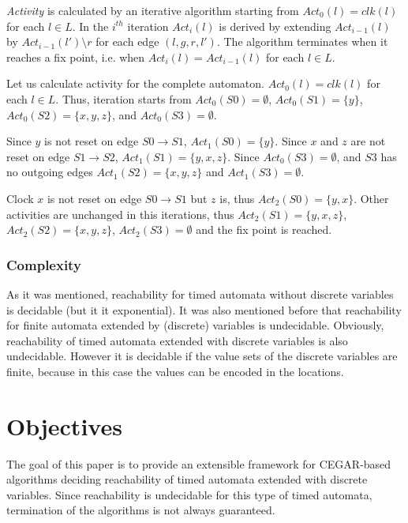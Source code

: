 \emph{Activity} is calculated by an iterative algorithm starting from $Act_0(l)=clk(l)$ for each $l \in L$. In the $i^{th}$ iteration $Act_{i}(l)$ is derived by extending $Act_{i-1}(l)$ by $Act_{i-1}(l')\setminus r$ for each edge $(l,g,r,l')$. The algorithm terminates when it reaches a fix point, i.e. when $Act_{i}(l)=Act_{i-1}(l)$ for each $l\in L$.

\begin{example}
	Let us calculate activity for the complete automaton. $Act_0(l)=clk(l)$ for each $l \in L$. Thus, iteration starts from $Act_0(S0)=\emptyset$, $Act_0(S1)=\{y\}$, $Act_0(S2)=\{x,y,z\}$, and $Act_0(S3)=\emptyset$. 
	
	Since $y$ is not reset on edge $S0 \to S1$, $Act_1(S0)=\{y\}$. Since $x$ and $z$ are not reset on edge $S1 \to S2$, $Act_1(S1)=\{y,x,z\}$. Since $Act_0(S3)=\emptyset$, and $S3$ has no outgoing edges $Act_1(S2)=\{x,y,z\}$ and $Act_1(S3)=\emptyset$.
	
	Clock $x$ is not reset on edge  $S0 \to S1$ but $z$ is, thus $Act_2(S0)=\{y,x\}$. Other activities are unchanged in this iterations, thus $Act_2(S1)=\{y,x,z\}$, $Act_2(S2)=\{x,y,z\}$, $Act_2(S3)=\emptyset$ and the fix point is reached.
	
\end{example}


\subsubsection{Complexity}

As it was mentioned, reachability for timed automata without discrete variables is decidable (but it it exponential). It was also mentioned before that reachability for finite automata extended by (discrete) variables is undecidable. Obviously, reachability of timed automata extended with discrete variables is also undecidable. However it is decidable if the value sets of the discrete variables are finite, because in this case the values can be encoded in the locations. 



\section{Objectives}

The goal of this paper is to provide an extensible framework for CEGAR-based algorithms deciding reachability of timed automata extended with discrete variables. Since reachability is undecidable for this type of timed automata, termination of the algorithms is not always guaranteed.

